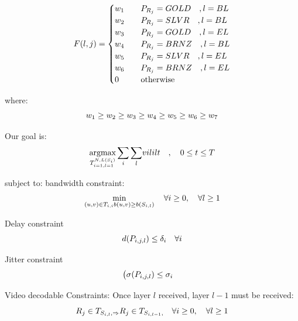 \documentclass[a4paper, 10pt, conference]{ieeeconf}
\DeclareMathOperator*{\argmax}{argmax}
\begin{document}
\begin{equation}
F(l, j) = 
\begin{cases}
    w_{1} 	&\quad P_{R_j} = GOLD \quad , l = BL \\
    w_{2} 	&\quad P_{R_j} = SLVR \quad , l = BL \\
    w_{3} 	&\quad P_{R_j} = GOLD \quad , l = EL \\
    w_{4} 	&\quad P_{R_j} = BRNZ \quad , l = BL \\
    w_{5} 	&\quad P_{R_j} = SLVR \quad , l = EL \\
    w_{6} 	&\quad P_{R_j} = BRNZ \quad , l = EL \\
    0 		&\quad\text{otherwise} \\ 
\end{cases}
\end{equation}

where:
\begin{equation}
w_{1} \ge w_{2} \ge w_{3} \ge w_{4} \ge w_{5} \ge w_{6} \ge w_{7}
\end{equation}

Our goal is:
\begin{equation}
\argmax_{T_{i=1,l=1}^{\numOfSrc , \lsi{\si{i}}} }{\sum_i \sum_l } vil{i}{l}{t} \quad , \quad 0 \le t \le T
\end{equation}

subject to:
\vspace{5mm} \newline
bandwidth constraint:
\begin{equation}
\min_{ (u,v) \in T_{i,i} b(u,v) \ge b(S_{i,l})} \quad \forall i \ge 0, \quad \forall l \ge 1
\end{equation}

Delay constraint
\begin{equation}
\dsil{\psilj{i}{j}{l}} \le \contentMaxDelay{i} \quad \forall i %
\end{equation}

Jitter constraint
\begin{equation}
\big(\jsil{\psilj{i}{j}{l}} \le \contentMaxJitter{i} \quad %
\end{equation}

Video decodable Constraints:
\vspace{5mm} \newline
Once layer $l$ received, layer $l-1$ must be received:
\begin{equation}
R_j \in T_{S_{i,l},\Rightarrow} R_j \in T_{S_{i,l-1},\quad} \forall i \ge 0, \quad \forall l \ge 1
\end{equation}
\end{document}
